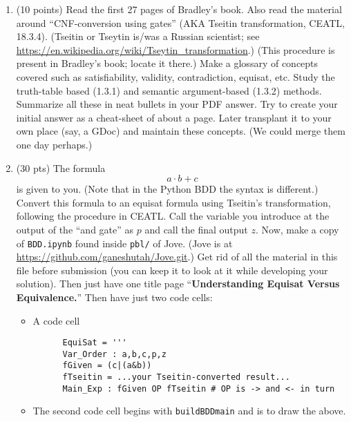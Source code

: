 \documentclass[11pt]{article}
\begin{document}
\begin{enumerate}
\item (10 points) Read the first 27 pages of Bradley's book.
  Also read the material around ``CNF-conversion using gates'' (AKA Tseitin transformation,
  CEATL, 18.3.4).
  (Tseitin or Tseytin is/was a Russian scientist; see
  \url{https://en.wikipedia.org/wiki/Tseytin_transformation}.)
  (This procedure is present in Bradley's book; locate it there.)
  Make a glossary of concepts covered
  such as satisfiability, validity, contradiction, equisat, etc. Study the truth-table based
  (1.3.1) and semantic argument-based (1.3.2) methods. Summarize all these in neat bullets
  in your PDF answer.
  Try to create your initial answer as a cheat-sheet of about a page. Later transplant it
  to your own place (say, a GDoc) and maintain these concepts. (We could merge them one day perhaps.)




\newlength{\minpagw}
\settowidth{\minpagw}{\hspace{40em}}

\begin{minipage}{\minpagw}
\end{minipage}

\clearpage


\item (30 pts) The formula
  \[ a\cdot b + c \]
  is given to you. (Note that in the Python BDD the syntax is different.)
  Convert this formula to an equisat formula using Tseitin's transformation,
  following the procedure in CEATL. Call the variable you introduce at the output
  of the ``and gate'' as $p$ and call the final output $z$.
  Now, make a copy of \verb|BDD.ipynb| found inside \verb|pbl/| of Jove.
  (Jove is at \url{https://github.com/ganeshutah/Jove.git}.)
  Get rid of all the material in this file before submission (you can keep it to look at it
  while developing your solution).
  Then just have one title page ``{\bf Understanding Equisat Versus Equivalence.}''
  Then have just two code cells:
  \begin{itemize}
  \item A code cell
    \begin{verbatim}
      EquiSat = '''
      Var_Order : a,b,c,p,z
      fGiven = (c|(a&b))
      fTseitin = ...your Tseitin-converted result...
      Main_Exp : fGiven OP fTseitin # OP is -> and <- in turn
\end{verbatim}
  \item The second code cell begins with {\tt buildBDDmain} and is to draw the above.
  \end{itemize}
  

\end{enumerate}
\end{document}
